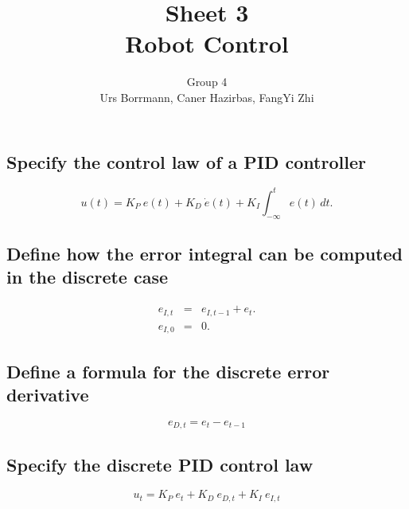 \documentclass[14pt,a4paper]{article}
\title{\textbf{Sheet 3} \\  \textbf{Robot Control}}
\author{Group 4 \\Urs Borrmann, Caner Hazirbas, FangYi Zhi}
\begin{document}
\maketitle
\onehalfspacing

\section{}
	\subsection{Specify the control law of a PID controller}
	$$
		u(t)=K_P \  e(t) + K_D \ \dot{e}(t) + K_I \int_{-\infty}^t e(t)\,dt.
	$$
	
	\subsection{Define how the error integral can be computed in the discrete case}
	\begin{eqnarray*}
		e_{I,t}&=&e_{I,t-1}+e_{t}. \\
		e_{I,0}&=&0.
	\end{eqnarray*}
	
	\subsection{Define a formula for the discrete error derivative}
	$$
		e_{D,t}=e_t - e_{t-1}
	$$
	
	\subsection{Specify the discrete PID control law}
	$$
		u_t=K_P \ e_t + K_D \ e_{D,t}+K_I \ e_{I,t}
	$$
	
\end{document}
